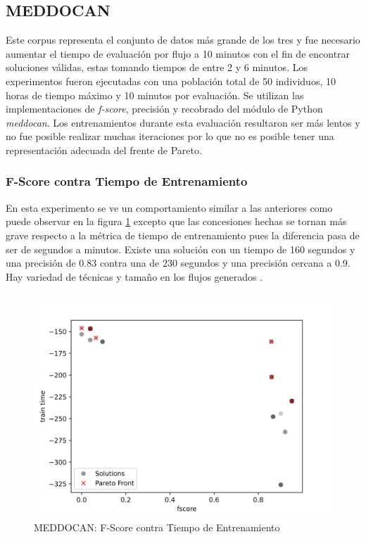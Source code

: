 \subsection{MEDDOCAN}
Este corpus representa el conjunto de datos m\'as grande de los tres y  fue necesario aumentar el tiempo de evaluaci\'on por flujo a 10 minutos con el fin de encontrar soluciones v\'alidas, estas tomando tiempos de entre 2 y 6 minutos. Los experimentos fueron ejecutadas con una poblaci\'on total de 50 individuos, 10 horas de tiempo m\'aximo y 10 minutos por evaluaci\'on. 
Se utilizan las implementaciones de \textit{f-score}, precisi\'on y recobrado del m\'odulo de Python \textit{meddocan}.
Los entrenamientos durante esta evaluaci\'on resultaron ser m\'as lentos y no fue posible realizar muchas iteraciones por lo que no es posible tener una representaci\'on adecuada del frente de Pareto.


\subsubsection{F-Score contra Tiempo de Entrenamiento}
En esta experimento se ve un comportamiento similar a las anteriores como puede observar en la figura  \ref{impl:fig:MEDDOCAN:fscore_vs_train_time} excepto que las concesiones hechas se tornan m\'as grave respecto a la m\'etrica de tiempo de entrenamiento pues la diferencia pasa de ser de segundos a minutos. Existe una soluci\'on con un tiempo de 160 segundos y una precisi\'on de 0.83 contra una de 230 segundos y una precisi\'on cercana a 0.9. Hay variedad de t\'ecnicas y tama\~no en los flujos generados .


\begin{figure}[ht]
    \centering
    \includegraphics[scale=0.65]{Pictures/meddocan_fscore_vs_train.jpg}
    \caption{MEDDOCAN: F-Score contra Tiempo de Entrenamiento}
    \label{impl:fig:MEDDOCAN:fscore_vs_train_time}
\end{figure}


